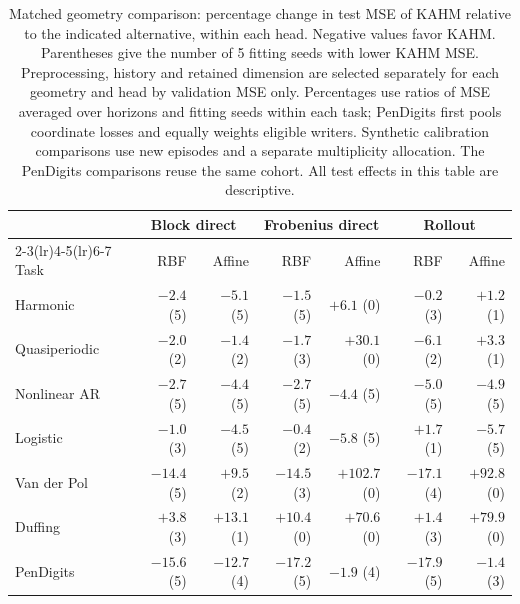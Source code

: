 \begin{table}[t]
\centering
\small
\setlength{\tabcolsep}{3.5pt}
\begin{tabular}{lrrrrrr}
\toprule
& \multicolumn{2}{c}{Block direct} & \multicolumn{2}{c}{Frobenius direct} & \multicolumn{2}{c}{Rollout} \\
\cmidrule(lr){2-3}\cmidrule(lr){4-5}\cmidrule(lr){6-7}
Task & RBF & Affine & RBF & Affine & RBF & Affine \\
\midrule
Harmonic & $-2.4$ (5) & $-5.1$ (5) & $-1.5$ (5) & $+6.1$ (0) & $-0.2$ (3) & $+1.2$ (1) \\
Quasiperiodic & $-2.0$ (2) & $-1.4$ (2) & $-1.7$ (3) & $+30.1$ (0) & $-6.1$ (2) & $+3.3$ (1) \\
Nonlinear AR & $-2.7$ (5) & $-4.4$ (5) & $-2.7$ (5) & $-4.4$ (5) & $-5.0$ (5) & $-4.9$ (5) \\
Logistic & $-1.0$ (3) & $-4.5$ (5) & $-0.4$ (2) & $-5.8$ (5) & $+1.7$ (1) & $-5.7$ (5) \\
Van der Pol & $-14.4$ (5) & $+9.5$ (2) & $-14.5$ (3) & $+102.7$ (0) & $-17.1$ (4) & $+92.8$ (0) \\
Duffing & $+3.8$ (3) & $+13.1$ (1) & $+10.4$ (0) & $+70.6$ (0) & $+1.4$ (3) & $+79.9$ (0) \\
PenDigits & $-15.6$ (5) & $-12.7$ (4) & $-17.2$ (5) & $-1.9$ (4) & $-17.9$ (5) & $-1.4$ (3) \\
\bottomrule
\end{tabular}
\caption{Matched geometry comparison: percentage change in test MSE of KAHM relative to the indicated alternative, within each head. Negative values favor KAHM. Parentheses give the number of 5 fitting seeds with lower KAHM MSE. Preprocessing, history and retained dimension are selected separately for each geometry and head by validation MSE only. Percentages use ratios of MSE averaged over horizons and fitting seeds within each task; PenDigits first pools coordinate losses and equally weights eligible writers. Synthetic calibration comparisons use new episodes and a separate multiplicity allocation. The PenDigits comparisons reuse the same cohort. All test effects in this table are descriptive.}
\label{tab:matched-geometry-primary}
\end{table}
